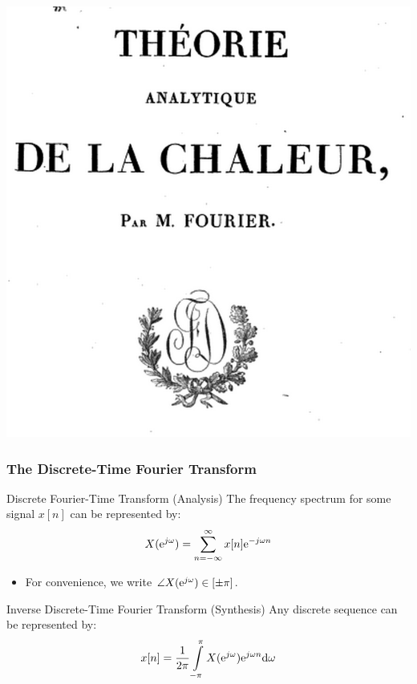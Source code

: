 \documentclass[mathserif,9pt,handout]{beamer}
\def\d{\mathrm{d}}
\begin{document}
\begin{frame}
\begin{center}
     \includegraphics[height=.4\textheight]{f4.png}\hspace{1em} 
  \end{center}
\end{frame}


\begin{frame}\frametitle{The Discrete-Time Fourier Transform}
   
   \begin{block}{Discrete Fourier-Time Transform (Analysis)}
   The frequency spectrum for some signal $x[n]$ can be represented by: 
   \begin{align}
     X({\textrm{e}}^{j\omega}) = \sum_{n=-\infty}^{\infty} x[n] {\textrm{e}}^{-j\omega n}
     \nonumber
   \end{align}
   \begin{itemize}
     \item For convenience, we write $\angle X({\textrm{e}}^{j\omega}) \in [\pm\pi]$. 
   \end{itemize}
   \end{block}
   
   \begin{exampleblock}{Inverse Discrete-Time Fourier Transform (Synthesis)}
   Any discrete sequence can be represented by: 
   \begin{align}
     x[n] = \frac{1}{2\pi} \int\limits_{-\pi}^{\pi} X(\e^{j\omega}) \e^{j\omega n} \d\omega
     \nonumber
   \end{align}
   \end{exampleblock}
\end{frame}
\end{document}
